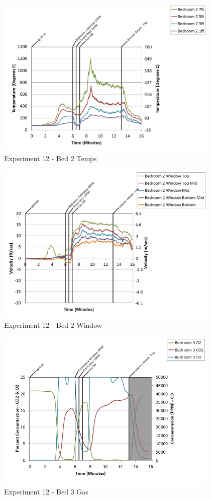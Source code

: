 \documentclass{article}
\begin{document}
\begin{appendices}
\clearpage

\begin{figure}[h!]
	\centering
	\includegraphics[height=3.05in]{0_Images/Results_Charts/Exp_12_Charts/Bed2Temps.png}
	\caption{Experiment 12 - Bed 2 Temps}
\end{figure}


\begin{figure}[h!]
	\centering
	\includegraphics[height=3.05in]{0_Images/Results_Charts/Exp_12_Charts/Bed2Window.png}
	\caption{Experiment 12 - Bed 2 Window}
\end{figure}

\clearpage

\begin{figure}[h!]
	\centering
	\includegraphics[height=3.05in]{0_Images/Results_Charts/Exp_12_Charts/Bed3Gas.png}
	\caption{Experiment 12 - Bed 3 Gas}
\end{figure}



\end{appendices}
\end{document}
